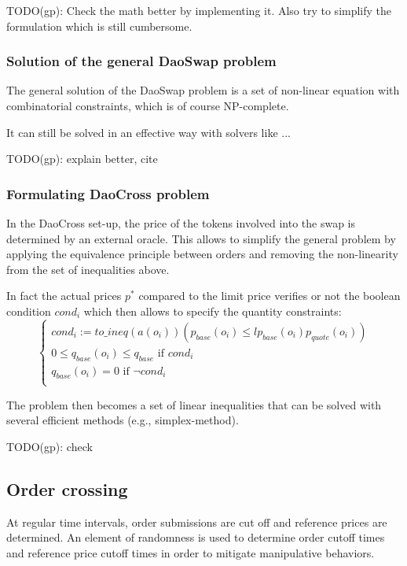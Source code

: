 \documentclass[11pt, reqno]{amsart}
\begin{document}
TODO(gp): Check the math better by implementing it. Also try to simplify the
formulation which is still cumbersome.

\subsubsection{Solution of the general DaoSwap problem}

The general solution of the DaoSwap problem is a set of non-linear equation with 
combinatorial constraints, which is of course NP-complete.

It can still be solved in an effective way with solvers like ...

TODO(gp): explain better, cite

\subsubsection{Formulating DaoCross problem}
In the DaoCross set-up, the price of the tokens involved into the swap is
determined by an external oracle.
This allows to simplify the general problem by applying the equivalence
principle between orders and removing the non-linearity from the set of
inequalities above.

In fact the actual prices $p^*$ compared to the limit price verifies or not the
boolean condition $cond_i$ which then allows to specify the quantity
constraints:
\begin{equation}
  \begin{cases}
    cond_i := \mathit{to\_ineq}(a(o_i))(p_{base}(o_i) \leq lp_{base}(o_i) p_{quote}(o_i)) \\
    0 \le q_{base}(o_i) \le q_{base} \text{ if } cond_i \\
    q_{base}(o_i) = 0 \text{ if } \lnot cond_i \\
  \end{cases}
\end{equation}

The problem then becomes a set of linear inequalities that can be solved with
several efficient methods (e.g., simplex-method).

TODO(gp): check


\subsection{Order crossing}
At regular time intervals, order submissions are cut off and reference prices
are determined. An element of randomness is used to determine order cutoff
times and reference price cutoff times in order to
mitigate manipulative behaviors.
\end{document}

